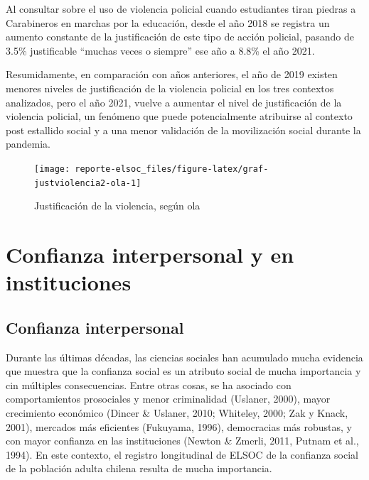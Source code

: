 \documentclass[
  12pt,
]{book}
\begin{document}
Al consultar sobre el uso de violencia policial cuando estudiantes tiran piedras a Carabineros en marchas por la educación, desde el año 2018 se registra un aumento constante de la justificación de este tipo de acción policial, pasando de 3.5\% justificable ``muchas veces o siempre'' ese año a 8.8\% el año 2021.

Resumidamente, en comparación con años anteriores, el año de 2019 existen menores niveles de justificación de la violencia policial en los tres contextos analizados, pero el año 2021, vuelve a aumentar el nivel de justificación de la violencia policial, un fenómeno que puede potencialmente atribuirse al contexto post estallido social y a una menor validación de la movilización social durante la pandemia.

\begin{figure}

{\centering \texttt{[image: reporte-elsoc\_files/figure-latex/graf-justviolencia2-ola-1]} 

}

\caption{Justificación de la violencia, según ola}\label{fig:graf-justviolencia2-ola}
\end{figure}

\hypertarget{confianza-interpersonal-y-en-instituciones}{%
\section{Confianza interpersonal y en instituciones}\label{confianza-interpersonal-y-en-instituciones}}

\hypertarget{confianza-interpersonal}{%
\subsection*{Confianza interpersonal}\label{confianza-interpersonal}}

Durante las últimas décadas, las ciencias sociales han acumulado mucha evidencia que muestra que la confianza social es un atributo social de mucha importancia y cin múltiples consecuencias. Entre otras cosas, se ha asociado con comportamientos prosociales y menor criminalidad (Uslaner, 2000), mayor crecimiento económico (Dincer \& Uslaner, 2010; Whiteley, 2000; Zak y Knack, 2001), mercados más eficientes (Fukuyama, 1996), democracias más robustas, y con mayor confianza en las instituciones (Newton \& Zmerli, 2011, Putnam et al., 1994). En este contexto, el registro longitudinal de ELSOC de la confianza social de la población adulta chilena resulta de mucha importancia.
\end{document}
